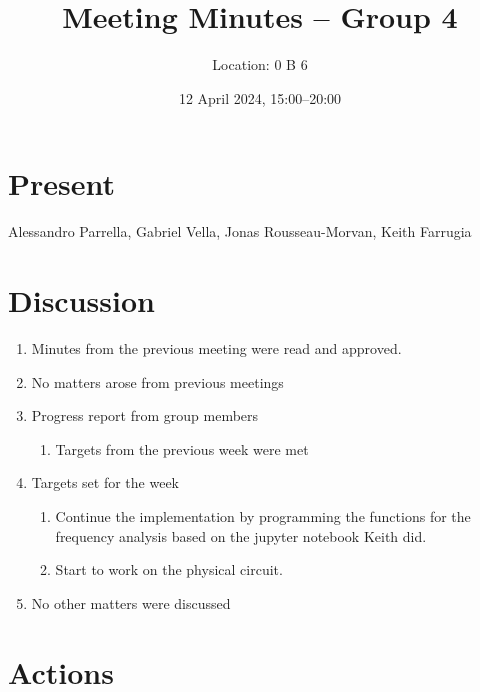 \documentclass{cce2014-meetings}
\title{Meeting Minutes -- Group 4}
\author{Location: 0 B 6}
\date{12 April 2024, 15:00--20:00}
\begin{document}
\maketitle

\section*{Present}
Alessandro Parrella,
Gabriel Vella,
Jonas Rousseau-Morvan,
Keith Farrugia

\section*{Discussion}

\begin{enumerate}


      \item Minutes from the previous meeting were read and approved.

      \item No matters arose from previous meetings

      \item Progress report from group members
            \begin{enumerate}
                  \item Targets from the previous week were met 
            \end{enumerate}

      \item Targets set for the week
            \begin{enumerate}
                  \item Continue the implementation by programming the functions
                  for the frequency analysis based on the jupyter notebook Keith
                  did.
                  \item Start to work on the physical circuit.
            \end{enumerate}
            
      \item No other matters were discussed
\end{enumerate}

\section*{Actions}
\end{document}
